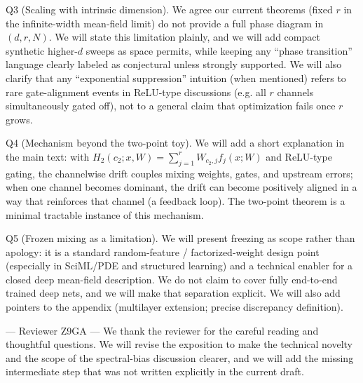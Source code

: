 Q3 (Scaling with intrinsic dimension). We agree our current theorems (fixed $r$ in the infinite-width mean-field limit) do not provide a full phase diagram in $(d,r,N)$. We will state this limitation plainly, and we will add compact synthetic higher-$d$ sweeps as space permits, while keeping any “phase transition” language clearly labeled as conjectural unless strongly supported.
We will also clarify that any “exponential suppression” intuition (when mentioned) refers to rare gate-alignment events in ReLU-type discussions (e.g. all $r$ channels simultaneously gated off), not to a general claim that optimization fails once $r$ grows.

Q4 (Mechanism beyond the two-point toy). We will add a short explanation in the main text: with $H_2(c_2;x,W)=\sum_{j=1}^r W_{c_2,j} f_j(x;W)$ and ReLU-type gating, the channelwise drift couples mixing weights, gates, and upstream errors; when one channel becomes dominant, the drift can become positively aligned in a way that reinforces that channel (a feedback loop). The two-point theorem is a minimal tractable instance of this mechanism.

Q5 (Frozen mixing as a limitation). We will present freezing as scope rather than apology: it is a standard random-feature / factorized-weight design point (especially in SciML/PDE and structured learning) and a technical enabler for a closed deep mean-field description. We do not claim to cover fully end-to-end trained deep nets, and we will make that separation explicit.
We will also add pointers to the appendix (multilayer extension; precise discrepancy definition).


--- Reviewer Z9GA ---
We thank the reviewer for the careful reading and thoughtful questions. We will revise the exposition to make the technical novelty and the scope of the spectral-bias discussion clearer, and we will add the missing intermediate step that was not written explicitly in the current draft.


